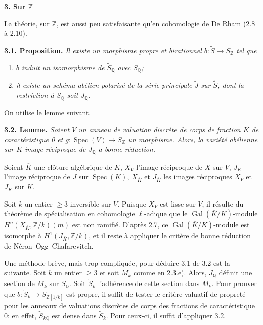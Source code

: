 \documentclass[10pt]{article}
\newcommand{\Q}{\mathbb Q}
\newcommand{\Z}{\mathbb Z}
\newcommand{\Spec}{\operatorname{Spec}}
\newcommand{\Gal}{\operatorname{Gal}}
\begin{document}
\begin{center}\bfseries 3. Sur \(\Z\)\end{center}

La théorie, sur \(\Z\), est aussi peu satisfaisante qu'en cohomologie de De Rham (2.8 à 2.10).

\noindent\textbf{3.1. Proposition.} \emph{Il existe un morphisme propre et birationnel \(b:\widetilde S\longrightarrow S_\Z\) tel que}
\begin{enumerate}[label=\alph*)]
\item \emph{\(b\) induit un isomorphisme de \(\widetilde S_\Q\) avec \(S_\Q\);}
\item \emph{il existe un schéma abélien polarisé de la série principale \(\widetilde J\) sur \(\widetilde S\), dont la restriction à \(S_\Q\) soit \(J_\Q\).}
\end{enumerate}

On utilise le lemme suivant.

\noindent\textbf{3.2. Lemme.} \emph{Soient \(V\) un anneau de valuation discrète de corps de fraction \(K\) de caractéristique 0 et \(g:\Spec(V)\longrightarrow S_\Z\) un morphisme. Alors, la variété abélienne sur \(K\) image réciproque de \(J_\Q\) a bonne réduction.}

Soient \(\overline K\) une clôture algébrique de \(K\), \(X_V\) l'image réciproque de \(X\) sur \(V\), \(J_K\) l'image réciproque de \(J\) sur \(\Spec(K)\), \(X_{\overline K}\) et \(J_{\overline K}\) les images réciproques \(X_V\) et \(J_K\) sur \(\overline K\).

Soit \(k\) un entier \(\geq3\) inversible sur \(V\). Puisque \(X_V\) est lisse sur \(V\), il résulte du théorème de spécialisation en cohomologie \(\ell\)-adique que le \(\Gal(\overline K/K)\)-module \(H^n(X_{\overline K},\Z/k)(m)\) est non ramifié. D'après 2.7, ce \(\Gal(\overline K/K)\)-module est isomorphe à \(H^1(J_{\overline K},\Z/k)\), et il reste à appliquer le critère de bonne réduction de Néron--Ogg--Chafarevitch.

Une méthode brève, mais trop compliquée, pour déduire 3.1 de 3.2 est la suivante. Soit \(k\) un entier \(\geq3\) et soit \(M_k\) comme en 2.3.e). Alors, \(J_\Q\) définit une section de \(M_k\) sur \(S_\Q\). Soit \(\widetilde S_k\) l'adhérence de cette section dans \(M_k\). Pour prouver que \(b:\widetilde S_k\longrightarrow S_{\Z[1/k]}\) est propre, il suffit de tester le critère valuatif de propreté pour les anneaux de valuations discrètes de corps des fractions de caractéristique 0: en effet, \(\widetilde S_{k\Q}\) est dense dans \(\widetilde S_k\). Pour ceux-ci, il suffit d'appliquer 3.2.
\end{document}
